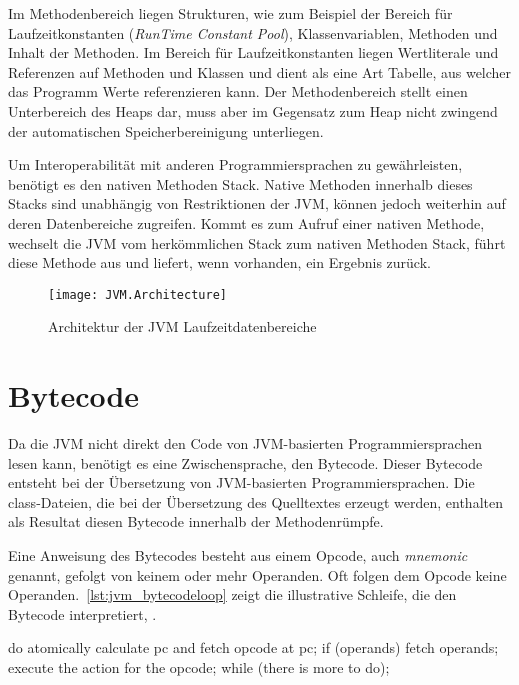 Im Methodenbereich liegen Strukturen, wie zum Beispiel der Bereich für Laufzeitkonstanten (\textit{Run\-Time Constant Pool}), Klassenvariablen, Methoden und Inhalt der Methoden. Im Bereich für Laufzeitkonstanten liegen Wertliterale und Referenzen auf Methoden und Klassen und dient als eine Art Tabelle, aus welcher das Programm Werte referenzieren kann.  Der Methodenbereich stellt einen Unterbereich des Heaps dar, muss aber im Gegensatz zum Heap nicht zwingend der automatischen Speicherbereinigung unterliegen.

Um Interoperabilität mit anderen Programmiersprachen zu gewährleisten, benötigt es den nativen Methoden Stack. Native Methoden innerhalb dieses Stacks sind unabhängig von Restriktionen der JVM, können jedoch weiterhin auf deren Datenbereiche zugreifen. Kommt es zum Aufruf einer nativen Methode, wechselt die JVM vom herkömmlichen Stack zum nativen Methoden Stack, führt diese Methode aus und liefert, wenn vorhanden, ein Ergebnis zurück.

\begin{figure}
    \caption{Architektur der JVM Laufzeitdatenbereiche}
    \centering
    \texttt{[image: JVM.Architecture]}
    \label{fig:jvm-architecture}
\end{figure}

\section{Bytecode}

Da die JVM nicht direkt den Code von JVM-basierten Programmiersprachen lesen kann, benötigt es eine Zwischensprache, den Bytecode. Dieser Bytecode entsteht bei der Übersetzung von JVM-basierten Programmiersprachen. Die class-Dateien, die bei der Übersetzung des Quelltextes erzeugt werden, enthalten als Resultat diesen Bytecode innerhalb der Methodenrümpfe.

Eine Anweisung des Bytecodes besteht aus einem Opcode, auch \textit{mnemonic} genannt, gefolgt von keinem oder mehr Operanden. Oft folgen dem Opcode keine Operanden.~\autoref{lst:jvm_bytecodeloop} zeigt die illustrative Schleife, die den Bytecode interpretiert, \parencite[siehe S. 25]{lindholm2016java}.

\begin{JavaCode}[numbers=none, caption={Auszug aus der JVM Spezifikation, welche die Interpretationsschleife für Bytecode repräsentiert.}, label=lst:jvm_bytecodeloop]
do {
    atomically calculate pc and fetch opcode at pc;
    if (operands) fetch operands;
    execute the action for the opcode;
} while (there is more to do);
\end{JavaCode}

